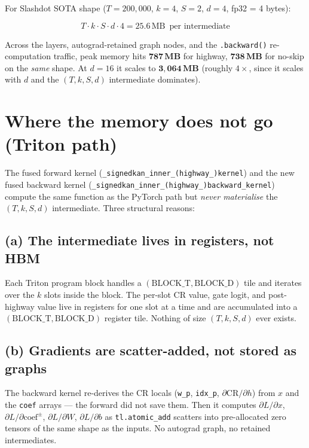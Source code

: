 \documentclass[11pt,a4paper]{article}
\begin{document}
For Slashdot SOTA shape ($T=200{,}000$, $k=4$, $S=2$, $d=4$, fp32 = 4 bytes):

$$
T \cdot k \cdot S \cdot d \cdot 4 = 25.6\,\text{MB}\,\text{ per intermediate}
$$

Across the layers, autograd-retained graph nodes, and the
\texttt{.backward()} re-computation traffic, peak memory hits
$\mathbf{787\,MB}$ for highway, $\mathbf{738\,MB}$ for no-skip on the
\emph{same} shape. At $d=16$ it scales to $\mathbf{3{,}064\,MB}$
(roughly $4\times$, since it scales with $d$ and the $(T, k, S, d)$
intermediate dominates).

\section{Where the memory does not go (Triton path)}

The fused forward kernel
(\texttt{\_signedkan\_inner\_(highway\_)kernel}) and the new fused
backward kernel
(\texttt{\_signedkan\_inner\_(highway\_)backward\_kernel}) compute the
same function as the PyTorch path but \emph{never materialise} the
$(T, k, S, d)$ intermediate. Three structural reasons:

\subsection*{(a) The intermediate lives in registers, not HBM}

Each Triton program block handles a $(\mathrm{BLOCK\_T},
\mathrm{BLOCK\_D})$ tile and iterates over the $k$ slots inside the
block. The per-slot CR value, gate logit, and post-highway value live in
registers for one slot at a time and are accumulated into a
$(\mathrm{BLOCK\_T}, \mathrm{BLOCK\_D})$ register tile. Nothing of size
$(T, k, S, d)$ ever exists.

\subsection*{(b) Gradients are scatter-added, not stored as graphs}

The backward kernel re-derives the CR locals (\texttt{w\_p},
\texttt{idx\_p}, $\partial\mathrm{CR}/\partial h$) from $x$ and the
\texttt{coef} arrays --- the forward did not save them. Then it
computes $\partial L/\partial x$, $\partial L/\partial \mathrm{coef}^{\pm}$,
$\partial L/\partial W$, $\partial L/\partial b$ as
\texttt{tl.atomic\_add} scatters into pre-allocated zero tensors of the
same shape as the inputs. No autograd graph, no retained intermediates.
\end{document}
